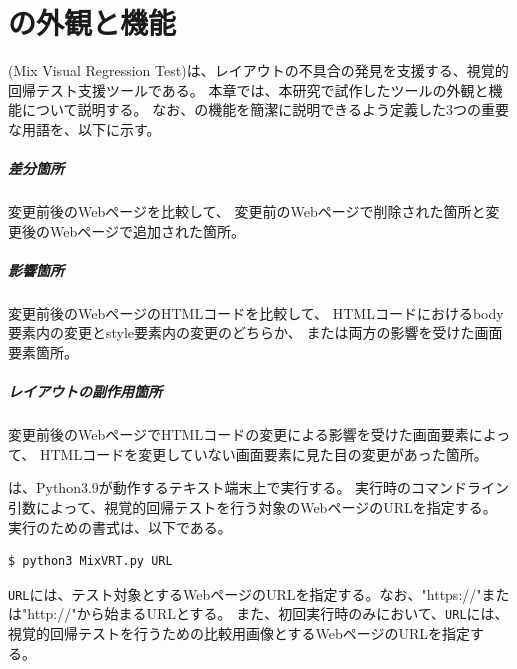 \chapter{ \toolName の外観と機能}\label{cha:Function}
\toolName (Mix Visual Regression Test)は、レイアウトの不具合の発見を支援する、視覚的回帰テスト支援ツールである。
本章では、本研究で試作したツール\toolName の外観と機能について説明する。
なお、\toolName の機能を簡潔に説明できるよう定義した3つの重要な用語を、以下に示す。
\paragraph{差分箇所}
変更前後のWebページを比較して、
変更前のWebページで削除された箇所と変更後のWebページで追加された箇所。
\paragraph{影響箇所}
変更前後のWebページのHTMLコードを比較して、
HTMLコードにおけるbody要素内の変更とstyle要素内の変更のどちらか、
または両方の影響を受けた画面要素箇所。
\paragraph{レイアウトの副作用箇所}
変更前後のWebページでHTMLコードの変更による影響を受けた画面要素によって、
HTMLコードを変更していない画面要素に見た目の変更があった箇所。
\vspace{8mm}
\par

\toolName は、Python3.9\cite{Python}が動作するテキスト端末上で実行する。
\toolName 実行時のコマンドライン引数によって、視覚的回帰テストを行う対象のWebページのURLを指定する。
\toolName 実行のための書式は、以下である。
\begin{lstlisting}[label=list:command,frame=none,numbers=none,basicstyle={\normalsize \ttfamily \color[gray]{.15}}]
  $ python3 MixVRT.py URL
 \end{lstlisting}
{\tt URL}には、テスト対象とするWebページのURLを指定する。なお、"https://"または"http://"から始まるURLとする。
また、初回実行時のみにおいて、{\tt URL}には、視覚的回帰テストを行うための比較用画像とするWebページのURLを指定する。
\par

